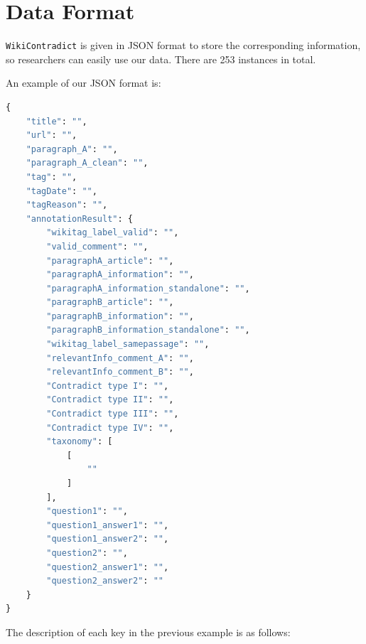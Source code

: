 \documentclass{article}
\begin{document}
\section{Data Format}

\label{appx:format}


\texttt{WikiContradict} is given in JSON format to store the corresponding information, so researchers can easily use our data. There are 253 instances in total.



An example of our JSON format is:
\begin{lstlisting}[language=python]      
{
    "title": "",
    "url": "",
    "paragraph_A": "",
    "paragraph_A_clean": "",
    "tag": "",
    "tagDate": "",
    "tagReason": "",
    "annotationResult": {
        "wikitag_label_valid": "",
        "valid_comment": "",
        "paragraphA_article": "",
        "paragraphA_information": "",
        "paragraphA_information_standalone": "",
        "paragraphB_article": "",
        "paragraphB_information": "",
        "paragraphB_information_standalone": "",
        "wikitag_label_samepassage": "",
        "relevantInfo_comment_A": "",
        "relevantInfo_comment_B": "",
        "Contradict type I": "",
        "Contradict type II": "",
        "Contradict type III": "",
        "Contradict type IV": "",
        "taxonomy": [
            [
                ""                    
            ]
        ],
        "question1": "",
        "question1_answer1": "",
        "question1_answer2": "",
        "question2": "",
        "question2_answer1": "",
        "question2_answer2": ""
    }
}
\end{lstlisting}


The description of each key in the previous example is as follows:
\end{document}
